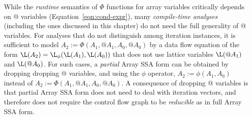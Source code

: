 While the  {\em runtime} semantics of 
$\Phi$ functions for array variables critically depends on @ variables (Equation~\ref{eqn:cond-expr}),
many {\em compile-time analyses} (including the ones discussed in this
chapter) do not need the full generality of @ variables.  
For analyses that do not distinguish among iteration instances,
it is sufficient to model
$A_2 := \Phi(A_1, @A_1, A_0, @A_0)$ by
a data flow equation of the form $\L(A_2) = \L_{\phi}(\L(A_1), \L(A_0))$
that does not use lattice variables $\L(@A_1)$ and $\L(@A_0)$.
For such cases, a {\it partial}
Array SSA form can be obtained by dropping 
dropping @ variables, and using the
$\phi$ operator, $A_2 := \phi(A_1, A_0)$ instead of
$A_2 := \Phi(A_1, @A_1, A_0, @A_0)$.  
A consequence of dropping @ variables is that partial Array
SSA form does not need to deal with iteration
vectors, and therefore does not require the control flow
graph to be {\it reducible} as in full Array SSA form.





